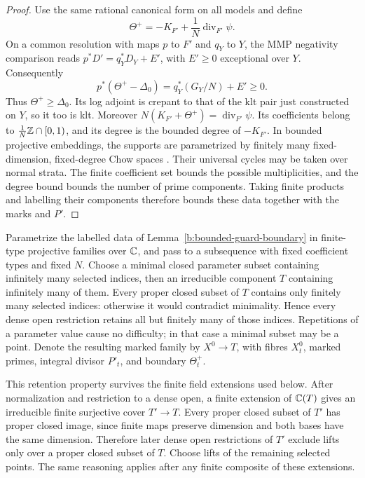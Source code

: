 \begin{proof}
Use the same rational canonical form on all models and define
\[
 \Theta^+=-K_{F'}+\frac1N\operatorname{div}_{F'}\psi.
\]
On a common resolution with maps \(p\) to \(F'\) and \(q_Y\) to \(Y\),
the MMP negativity comparison reads
\(p^*D'=q_Y^*D_Y+E'\), with \(E'\geq0\) exceptional over \(Y\).
Consequently
\[
 p^*(\Theta^+-\Delta_0)=q_Y^*(G_Y/N)+E'\geq0.
\]
Thus \(\Theta^+\geq\Delta_0\). Its log adjoint is crepant to that of
the klt pair just constructed on \(Y\), so it too is klt. Moreover
\(N(K_{F'}+\Theta^+)=\operatorname{div}_{F'}\psi\).
Its coefficients belong to \(\frac1N\mathbb Z\cap[0,1)\), and its degree is
the bounded degree of \(-K_{F'}\). In bounded projective embeddings,
the supports are parametrized by finitely many fixed-dimension,
fixed-degree Chow spaces \cite[Definition~3.21]{KollarChow2017}. Their
universal cycles may be taken over normal strata. The finite coefficient
set bounds the possible multiplicities, and the degree bound bounds the
number of prime components. Taking finite products and labelling their
components therefore bounds these data together with the marks and
\(P'\).
\end{proof}

Parametrize the labelled data of Lemma~\ref{b:bounded-guard-boundary} in
finite-type projective families over \(\mathbb C\), and pass to a subsequence
with fixed coefficient types and fixed \(N\). Choose a minimal closed
parameter subset containing infinitely many selected indices, then an
irreducible component \(T\) containing infinitely many of them. Every
proper closed subset of \(T\) contains only finitely many selected indices:
otherwise it would contradict minimality. Hence every dense open
restriction retains all but finitely many of those indices. Repetitions
of a parameter value cause no difficulty; in that case a minimal subset
may be a point. Denote the resulting marked family by
\(X^0\to T\), with fibres \(X^0_t\), marked primes, integral divisor
\(P'_t\), and boundary \(\Theta^+_t\).

This retention property survives the finite field extensions used below.
After normalization and restriction to a dense open, a finite extension of
\(\mathbb C(T)\) gives an irreducible finite surjective cover \(T'\to T\).
Every proper closed subset of \(T'\) has proper closed image, since finite
maps preserve dimension and both bases have the same dimension. Therefore
later dense open restrictions of \(T'\) exclude lifts only over a proper
closed subset of \(T\). Choose lifts of the remaining selected points.
The same reasoning applies after any finite composite of these extensions.

